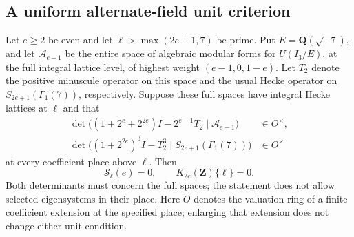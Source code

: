 \subsection{A uniform alternate-field unit criterion}
\label{sec:minus7-general-source}

\begin{proposition}
\label{prop:minus7-general-source}
Let $e\geq2$ be even and let $\ell>\max(2e+1,7)$ be prime.
Put $E=\mathbf Q(\sqrt{-7})$, and let $\mathcal A_{e-1}$ be the
entire space of algebraic modular forms for $U(I_3/E)$, at the full
integral lattice level, of highest weight $(e-1,0,1-e)$.
Let $T_2$ denote the positive minuscule operator on this space and
the usual Hecke operator on $S_{2e+1}(\Gamma_1(7))$, respectively.
Suppose these full spaces have integral Hecke lattices at $\ell$
and that
\[
 \begin{split}
 \det\bigl((1+2^e+2^{2e})I-2^{e-1}T_2
                         \mid\mathcal A_{e-1}\bigr)&\in O^\times,\\
 \det\bigl((1+2^{2e})^3I-T_2^3
                         \mid S_{2e+1}(\Gamma_1(7))\bigr)&\in O^\times
 \end{split}
 \tag{GS7.1}
\]
at every coefficient place above $\ell$. Then
\[
             \mathcal S_\ell(e)=0,
             \qquad K_{2e}(\mathbf Z)\{\ell\}=0.
 \tag{GS7.2}
\]
Both determinants must concern the full spaces; the statement does
not allow selected eigensystems in their place.
Here $O$ denotes the valuation ring of a finite coefficient
extension at the specified place; enlarging that extension does
not change either unit condition.
\end{proposition}

